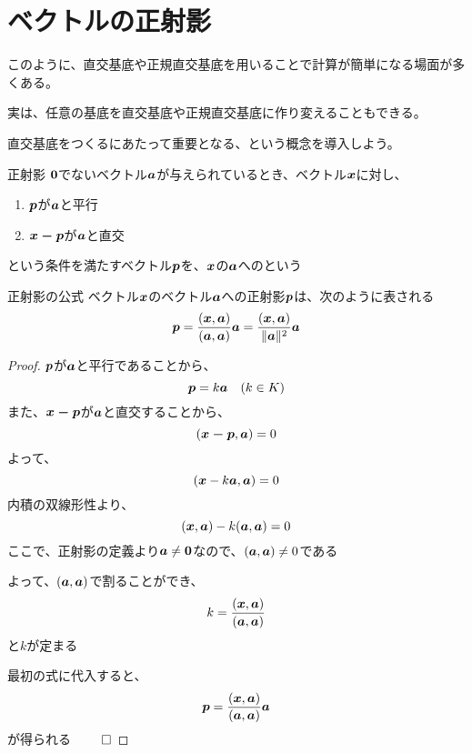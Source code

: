 \documentclass[../../../topic_linear-algebra]{subfiles}
\begin{document}
\sectionline
\section{ベクトルの正射影}

このように、直交基底や正規直交基底を用いることで計算が簡単になる場面が多くある。

実は、任意の基底を直交基底や正規直交基底に作り変えることもできる。

\br

直交基底をつくるにあたって重要となる、という概念を導入しよう。

\begin{definition}{正射影}
  $\vb*{0}$でないベクトル$\vb*{a}$が与えられているとき、ベクトル$\vb*{x}$に対し、
  \begin{enumerate}[label=\romanlabel]
    \item $\vb*{p}$が$\vb*{a}$と平行
    \item $\vb*{x - p}$が$\vb*{a}$と直交
  \end{enumerate}
  という条件を満たすベクトル$\vb*{p}$を、$\vb*{x}$の$\vb*{a}$へのという
\end{definition}

\begin{theorem}{正射影の公式}
  ベクトル$\vb*{x}$のベクトル$\vb*{a}$への正射影$\vb*{p}$は、次のように表される
  \begin{equation*}
    \vb*{p} = \frac{(\vb*{x}, \vb*{a})}{(\vb*{a}, \vb*{a})} \vb*{a} = \frac{(\vb*{x}, \vb*{a})}{\|\vb*{a}\|^2} \vb*{a}
  \end{equation*}
\end{theorem}

\begin{proof}
  $\vb*{p}$が$\vb*{a}$と平行であることから、
  \begin{equation*}
    \vb*{p} = k \vb*{a} \quad (k \in K)
  \end{equation*}
  また、$\vb*{x - p}$が$\vb*{a}$と直交することから、
  \begin{equation*}
    (\vb*{x-p},\vb*{a}) = 0
  \end{equation*}
  よって、
  \begin{equation*}
    (\vb*{x} - k \vb*{a}, \vb*{a}) = 0
  \end{equation*}
  内積の双線形性より、
  \begin{equation*}
    (\vb*{x}, \vb*{a}) - k (\vb*{a}, \vb*{a}) = 0
  \end{equation*}
  ここで、正射影の定義より$\vb*{a} \neq \vb*{0}$なので、$(\vb*{a}, \vb*{a}) \neq 0$である

  よって、$(\vb*{a}, \vb*{a})$で割ることができ、
  \begin{equation*}
    k = \frac{(\vb*{x}, \vb*{a})}{(\vb*{a}, \vb*{a})}
  \end{equation*}
  と$k$が定まる

  最初の式に代入すると、
  \begin{equation*}
    \vb*{p} = \frac{(\vb*{x}, \vb*{a})}{(\vb*{a}, \vb*{a})} \vb*{a}
  \end{equation*}
  が得られる $\qed$
\end{proof}
\end{document}
